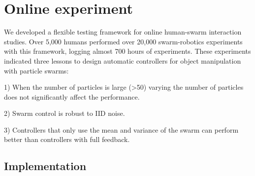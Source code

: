 \section{Online experiment}
\label{sec:expMethods}




We developed a flexible testing framework for online human-swarm interaction studies. Over 5,000 humans performed over 20,000 swarm-robotics experiments with this framework, logging almost 700 hours of experiments.
These experiments indicated three lessons to design automatic controllers for object manipulation with particle swarms:

1) When the number of particles is large (>50) varying the number of particles does not significantly affect the performance.

2) Swarm control is robust to IID noise.

3) Controllers that only use the mean and variance of the swarm can perform better than controllers with full feedback.


\subsection{Implementation}

